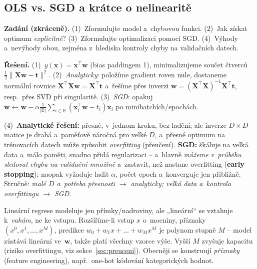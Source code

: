 \subsection{OLS vs. SGD a krátce o nelinearitě}

\begin{priklad}
\par
\textbf{Zadání (zkráceně).} (1)~Zformulujte model a~chybovou funkci. (2)~Jak získat optimum \emph{explicitně}? (3)~Zformulujte optimalizaci pomocí SGD. (4)~Výhody a~nevýhody obou, zejména z~hlediska kontroly chyby na validačních datech.

\smallskip
\textbf{Řešení.} (1)~$y(\mathbf{x})=\mathbf{x}^{\!\top}\mathbf{w}$ (bias paddingem 1), minimalizujeme součet čtverců $\tfrac12\|\mathbf{X}\mathbf{w}-\mathbf{t}\|^2$. (2)~\emph{Analyticky}: položíme gradient roven nule, dostaneme normální rovnice $\mathbf{X}^{\!\top}\mathbf{X}\mathbf{w}=\mathbf{X}^{\!\top}\mathbf{t}$ a~řešíme přes inverzi $\mathbf{w}=(\mathbf{X}^{\!\top}\mathbf{X})^{-1}\mathbf{X}^{\!\top}\mathbf{t}$, resp.\ přes SVD při singularitě. (3)~\emph{SGD}: opakuj $\mathbf{w}\leftarrow\mathbf{w}-\alpha\frac{1}{|\mathbb{B}|}\sum_{i\in\mathbb{B}}(\mathbf{x}_i^{\!\top}\mathbf{w}-t_i)\mathbf{x}_i$ po minibatchích/epochách.

(4)~\textbf{Analytické řešení:} přesné, v~jednom kroku, bez ladění; ale inverze $D\times D$ matice je drahá a~paměťově náročná pro velké $D$, a~přesné optimum na trénovacích datech může způsobit \emph{overfitting} (přeučení). \textbf{SGD:} škáluje na velká data a~málo paměti, snadno přidá regularizaci -- a~hlavně \emph{můžeme v~průběhu sledovat chybu na validační množině} a~zastavit, než nastane overfitting (\textbf{early stopping}); naopak vyžaduje ladit $\alpha$, počet epoch a~konverguje jen přibližně. Stručně: \emph{malé $D$ a~potřeba přesnosti $\to$ analyticky; velká data a~kontrola overfittingu $\to$ SGD}.
\end{priklad}

\begin{poznamka}
Lineární regrese modeluje jen přímky/nadroviny, ale „lineární`` se vztahuje k~\emph{vahám}, ne ke vstupu. Rozšíříme-li vstup $x$ o~mocniny, příznaky $(x^0,x^1,\dots,x^M)$, predikce $w_0+w_1x+\dots+w_Mx^M$ je polynom stupně $M$ -- model zůstává lineární ve~$\mathbf{w}$, takže platí všechny vzorce výše. Vyšší $M$ zvyšuje kapacitu (riziko overfittingu, viz sekce~\ref{sec:preuceni}). Obecněji se konstruují \emph{příznaky} (feature engineering), např.\ one-hot kódování kategorických hodnot.
\end{poznamka}

